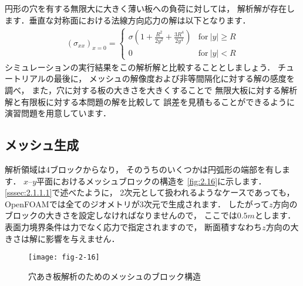 円形の穴を有する無限大に大きく薄い板への負荷に対しては，
解析解が存在します．垂直な対称面における法線方向応力の解は以下となります．
\begin{align}
 \label{eq:2.14}
 (\sigma_{xx})_{x=0} =
 \begin{cases}
  \displaystyle
  \sigma\left(1 + \frac{R^{2}}{2y^{2}} + \frac{3R^{4}}{2y^{4}}\right)
  & \text{for}\ |y| \ge R \\
  0 & \text{for}\ |y| < R
 \end{cases}
\end{align}
シミュレーションの実行結果をこの解析解と比較することとしましょう．
チュートリアルの最後に，
メッシュの解像度および非等間隔化に対する解の感度を調べ，
また，穴に対する板の大きさを大きくすることで
無限大板に対する解析解と有限板に対する本問題の解を比較して
誤差を見積もることができるように演習問題を用意しています．


\subsection{メッシュ生成}
\label{ssec:2.2.1}
解析領域は4ブロックからなり，
そのうちのいくつかは円弧形の端部を有します．
$x$--$y$平面におけるメッシュブロックの構造を
\autoref{fig:2.16}に示します．
\autoref{sssec:2.1.1.1}で述べたように，
2次元として扱われるようなケースであっても，
OpenFOAMでは全てのジオメトリが3次元で生成されます．
したがって$z$方向のブロックの大きさを設定しなければなりませんので，
ここでは$0.5\unit{m}$とします．
表面力境界条件は力でなく応力で指定されますので，
断面積すなわち$z$方向の大きさは解に影響を与えません．


\begin{figure}[ht]
 \texttt{[image: fig-2-16]}
 \caption{穴あき板解析のためのメッシュのブロック構造}
 \label{fig:2.16}
\end{figure}


